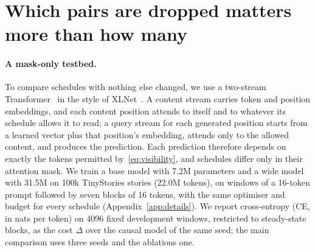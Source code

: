 \documentclass{article}
\theoremstyle{definition}
\theoremstyle{remark}
\begin{document}
\section{Which pairs are dropped matters more than how many}
\label{sec:study}

\paragraph{A mask-only testbed.}
To compare schedules with nothing else changed, we use a two-stream Transformer~\citep{vaswani2017attention} in the style of XLNet~\citep{yang2019xlnet}.
A content stream carries token and position embeddings, and each content position attends to itself and to whatever its schedule allows it to read; a query stream for each generated position starts from a learned vector plus that position's embedding, attends only to the allowed content, and produces the prediction.
Each prediction therefore depends on exactly the tokens permitted by~\eqref{eq:visibility}, and schedules differ only in their attention mask.
We train a base model with 7.2M parameters and a wide model with 31.5M on 100k TinyStories stories (22.0M tokens), on windows of a 16-token prompt followed by seven blocks of 16 tokens, with the same optimiser and budget for every schedule (Appendix~\ref{app:details}).
We report cross-entropy (CE, in nats per token) on 4096 fixed development windows, restricted to steady-state blocks, as the cost $\Delta$ over the causal model of the same seed; the main comparison uses three seeds and the ablations one.
\end{document}
